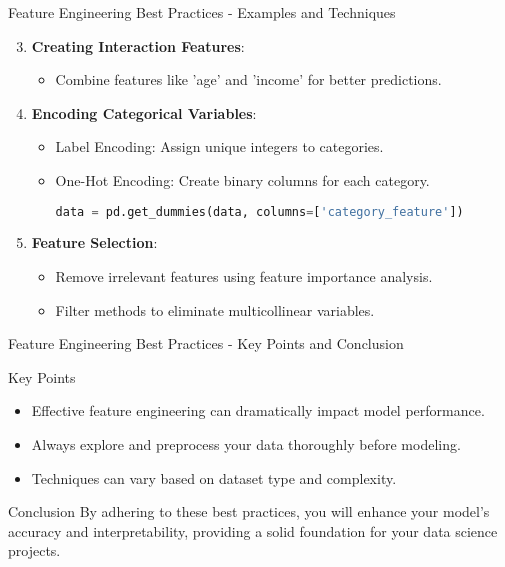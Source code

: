 \documentclass[aspectratio=169]{beamer}
\begin{document}
\begin{frame}[fragile]{Feature Engineering Best Practices - Examples and Techniques}
    \begin{enumerate}
        \setcounter{enumi}{2}
        \item \textbf{Creating Interaction Features}:
            \begin{itemize}
                \item Combine features like 'age' and 'income' for better predictions.
            \end{itemize}

        \item \textbf{Encoding Categorical Variables}:
            \begin{itemize}
                \item Label Encoding: Assign unique integers to categories.
                \item One-Hot Encoding: Create binary columns for each category.
                \begin{lstlisting}[language=python]
data = pd.get_dummies(data, columns=['category_feature'])
                \end{lstlisting}
            \end{itemize}

        \item \textbf{Feature Selection}:
            \begin{itemize}
                \item Remove irrelevant features using feature importance analysis.
                \item Filter methods to eliminate multicollinear variables.
            \end{itemize}
    \end{enumerate}
\end{frame}

\begin{frame}[fragile]{Feature Engineering Best Practices - Key Points and Conclusion}
    \begin{block}{Key Points}
        \begin{itemize}
            \item Effective feature engineering can dramatically impact model performance.
            \item Always explore and preprocess your data thoroughly before modeling.
            \item Techniques can vary based on dataset type and complexity.
        \end{itemize}
    \end{block}

    \begin{block}{Conclusion}
        By adhering to these best practices, you will enhance your model's accuracy and interpretability, providing a solid foundation for your data science projects.
    \end{block}
\end{frame}
\end{document}
